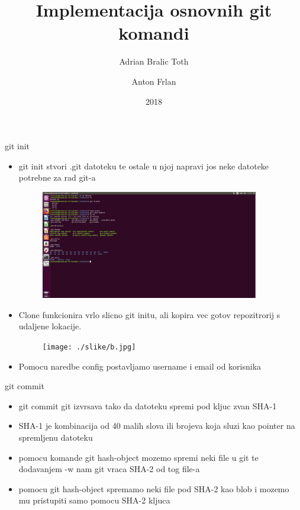 \documentclass[]{beamer}
\title{Implementacija osnovnih git komandi}
\author{Adrian Bralic Toth \and Anton Frlan}
\institute{Tehnički Fakultet Rijeka}
\date{2018}
\begin{document}
\frame{\titlepage}

\begin{frame}{git init}

\begin{itemize}
	\setlength\itemsep{2em}
	\item git init stvori .git datoteku te ostale u njoj napravi jos neke datoteke potrebne za rad git-a
	\begin{figure}
\centering
\includegraphics[width=0.9\textwidth]{./slike/git_datoteka.jpg}
\end{figure}
\end{itemize}

\end{frame}

\begin{frame}

\begin{itemize}{Clone & config}
	\item Clone funkcionira vrlo slicno git initu, ali kopira vec gotov repozitrorij s udaljene lokacije.
	\begin{figure}
	\texttt{[image: ./slike/b.jpg]}
	\end{figure}
	\item Pomocu naredbe config postavljamo username i email od korisnika
\end{itemize}

\end{frame}



\begin{frame}{git commit}

\begin{itemize}
	\setlength\itemsep{2.5em}
	\item git commit git izvrsava tako da datoteku spremi pod kljuc zvan SHA-1
	\item SHA-1 je kombinacija od 40 malih slova ili brojeva koja sluzi kao pointer na spremljenu datoteku
	\item pomocu komande git hash-object mozemo spremi neki file u git te dodavanjem -w nam git vraca SHA-2 od tog file-a
	\item pomocu git hash-object spremamo neki file pod SHA-2 kao blob i mozemo mu pristupiti samo pomocu SHA-2 kljuca
\end{itemize}

\end{frame}
\end{document}
